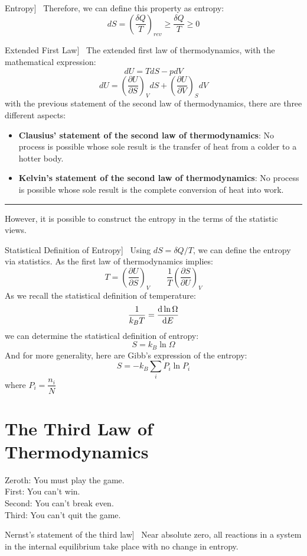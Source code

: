 \documentclass[UTF8]{book}
\newenvironment{theorem}[2][Theorem]{\begin{trivlist}
\item[\hskip \labelsep {\bfseries #1}\hskip \labelsep {\bfseries }]}{\end{trivlist}}
\begin{document}
\begin{theorem}
[Entropy]~  {Therefore, we can define this property as entropy:}
$$dS=\left(\dfrac{\delta Q}{T}\right)_{rev}\geq \dfrac{\delta Q}{T}\geq 0$$
\end{theorem}

\begin{theorem}
[Extended First Law]~  {The extended first law of thermodynamics, with the mathematical expression:}
$$\boxed{dU=TdS-pdV}$$
$$dU=\left(\dfrac{\partial U}{\partial S}\right)_VdS+\left(\dfrac{\partial U}{\partial V}\right)_SdV$$
 {with the previous statement of the second law of thermodynamics, there are three different aspects:}
\begin{itemize}
\item  {\textbf{Clausius' statement of the second law of thermodynamics}: No process is possible whose sole result is the transfer of heat from a colder to a hotter body.}
\item  {\textbf{Kelvin's statement of the second law of thermodynamics}: No process is possible whose sole result is the complete conversion of heat into work.}
\end{itemize}
\end{theorem}
\rule{\textwidth}{1pt}

{However, it is possible to construct the entropy in the terms of the statistic views.}
\begin{theorem}
[Statistical Definition of Entropy]~  { Using $dS=\delta Q/T$, we can define the entropy via statistics. As the first law of thermodynamics implies:}
$$T=\left(\dfrac{\partial U}{\partial S}\right)_V \qquad \dfrac{1}{T}\left(\dfrac{\partial S}{\partial U}\right)_V$$
 {As we recall the statistical definition of temperature:}
$$\dfrac{1}{k_BT}=\dv{\ln \Omega}{E}$$
 {we can determine the statistical definition of entropy:}
$$\boxed{S=k_B\ln \Omega }$$
 {And for more generality, here are Gibb's expression of the entropy:}
$$S=-k_B\sum_{i}P_i\ln P_i$$
 {where $P_i=\dfrac{n_i}{N}$}
\end{theorem}

\section{The Third Law of Thermodynamics}
\epigraph{Zeroth: You must play the game.\\
First: You can't win.\\
Second: You can't break even.\\
Third: You can't quit the game.}{}
\begin{theorem}
[Nernst's statement of the third law]~  {Near absolute zero, all reactions in a system in the internal equilibrium take place with no change in entropy.}
\end{theorem}
\end{document}

